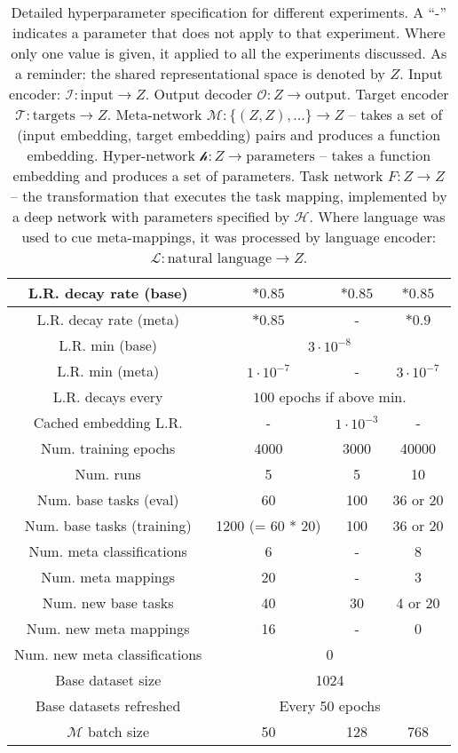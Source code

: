 \begin{table}
\begin{tabular}{|c||c|c|c|}
L.R. decay rate (base) & $*0.85$ & $*0.85$ & $*0.85$ \\\hline
L.R. decay rate (meta) & $*0.85$ & - & $*0.9$ \\\hline
L.R. min (base) & \multicolumn{3}{c|}{$3 \cdot 10^{-8}$} \\\hline
L.R. min (meta) & $1 \cdot 10^{-7}$& - & $3 \cdot 10^{-7}$ \\\hline
L.R. decays every & \multicolumn{3}{c|}{$100$ epochs if above min.} \\\hline
Cached embedding L.R. & - & $1\cdot 10^{-3}$ & -\\\hline
Num. training epochs & 4000 & 3000 & 40000 \\\hline
Num. runs & 5 & 5 & 10 \\ \hline
\hline
Num. base tasks (eval) & 60 & 100 & 36 or 20 \\\hline
Num. base tasks (training) & 1200 (= 60 * 20) & 100 & 36 or 20  \\\hline
Num. meta classifications & 6 & - & 8  \\\hline
Num. meta mappings & 20 & - & 3  \\\hline
Num. new base tasks & 40 & 30 & 4 or 20 \\\hline 
Num. new meta mappings & 16 & - & 0  \\\hline
Num. new meta classifications &  \multicolumn{3}{c|}{0} \\\hline
Base dataset size & \multicolumn{3}{c|}{1024} \\\hline
Base datasets refreshed & \multicolumn{3}{c|}{Every 50 epochs} \\\hline
$\mathcal{M}$ batch size & 50 & 128 & 768 \\\hline
\end{tabular}
\caption{Detailed hyperparameter specification for different experiments. A ``-'' indicates a parameter that does not apply to that experiment. Where only one value is given, it applied to all the experiments discussed. As a reminder: the shared representational space is denoted by $Z$. Input encoder: $\mathcal{I}: \text{input} \rightarrow Z$. Output decoder $\mathcal{O}: Z \rightarrow \text{output}$. Target encoder $\mathcal{T}: \text{targets} \rightarrow Z$. Meta-network $\mathcal{M}: \{(Z, Z), ...\} \rightarrow Z $ -- takes a set of (input embedding, target embedding) pairs and produces a function embedding. Hyper-network $\mathcal{h}: Z \rightarrow \text{parameters}$ -- takes a function embedding and produces a set of parameters. Task network $F: Z \rightarrow Z$ -- the transformation that executes the task mapping, implemented by a deep network with parameters specified by $\mathcal{H}$. Where language was used to cue meta-mappings, it was processed by language encoder: $\mathcal{L}: \text{natural language} \rightarrow Z$. } \label{supp_hyperparameter_table}
\end{table}
